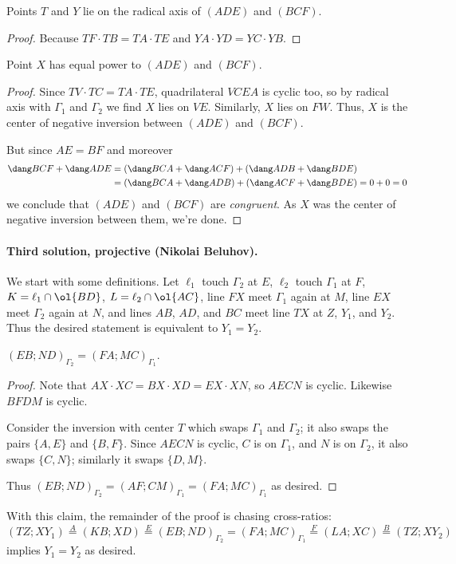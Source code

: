 \begin{claim*}
  Points $T$ and $Y$ lie on the radical axis of $(ADE)$ and $(BCF)$.
\end{claim*}
\begin{proof}
  Because $TF \cdot TB = TA \cdot TE$ and $YA \cdot YD = YC \cdot YB$.
\end{proof}

\begin{claim*}
  Point $X$ has equal power to $(ADE)$ and $(BCF)$.
\end{claim*}
\begin{proof}
  Since $TV \cdot TC = TA \cdot TE$, quadrilateral $VCEA$ is cyclic too,
  so by radical axis with $\Gamma_1$ and $\Gamma_2$ we find $X$ lies on $VE$.
  Similarly, $X$ lies on $FW$.
  Thus, $X$ is the center of negative inversion between $(ADE)$ and $(BCF)$.

  But since $AE = BF$ and moreover
  \begin{align*}
    \dang BCF + \dang ADE
    &= (\dang BCA + \dang ACF) + (\dang ADB + \dang BDE) \\
    &= (\dang BCA + \dang ADB) + (\dang ACF + \dang BDE) = 0 + 0 = 0
  \end{align*}
  we conclude that $(ADE)$ and $(BCF)$ are \emph{congruent}.
  As $X$ was the center of negative inversion between them, we're done.
\end{proof}

\paragraph{Third solution, projective (Nikolai Beluhov).}
We start with some definitions.
Let $\ell_1$ touch $\Gamma_2$ at $E$, $\ell_2$ touch $\Gamma_1$ at $F$,
$K = \ell_1 \cap \ol{BD}$, $L = \ell_2 \cap \ol{AC}$,
line $FX$ meet $\Gamma_1$ again at $M$,
line $EX$ meet $\Gamma_2$ again at $N$,
and lines $AB$, $AD$, and $BC$ meet line $TX$ at $Z$, $Y_1$, and $Y_2$.
Thus the desired statement is equivalent to $Y_1 = Y_2$.

\begin{claim*}
  $(EB; ND)_{\Gamma_2} = (FA; MC)_{\Gamma_1}$.
\end{claim*}

\begin{proof}
  Note that $AX \cdot XC = BX \cdot XD = EX \cdot XN$, so $AECN$ is cyclic.
  Likewise $BFDM$ is cyclic.

  Consider the inversion with center $T$ which swaps $\Gamma_1$ and $\Gamma_2$;
  it also swaps the pairs $\{A, E\}$ and $\{B, F\}$.
  Since $AECN$ is cyclic, $C$ is on $\Gamma_1$, and $N$ is on $\Gamma_2$,
  it also swaps $\{C, N\}$; similarly it swaps $\{D, M\}$.

  Thus $(EB; ND)_{\Gamma_2} = (AF; CM)_{\Gamma_1} = (FA; MC)_{\Gamma_1}$ as desired.
\end{proof}
With this claim, the remainder of the proof is chasing cross-ratios:
\[
  (TZ; XY_1)
  \stackrel{A}{=} (KB; XD)
  \stackrel{E}{=} (EB; ND)_{\Gamma_2}
  = (FA; MC)_{\Gamma_1}
  \stackrel{F}{=} (LA; XC)
  \stackrel{B}{=} (TZ; XY_2)
\]
implies $Y_1 = Y_2$ as desired.

